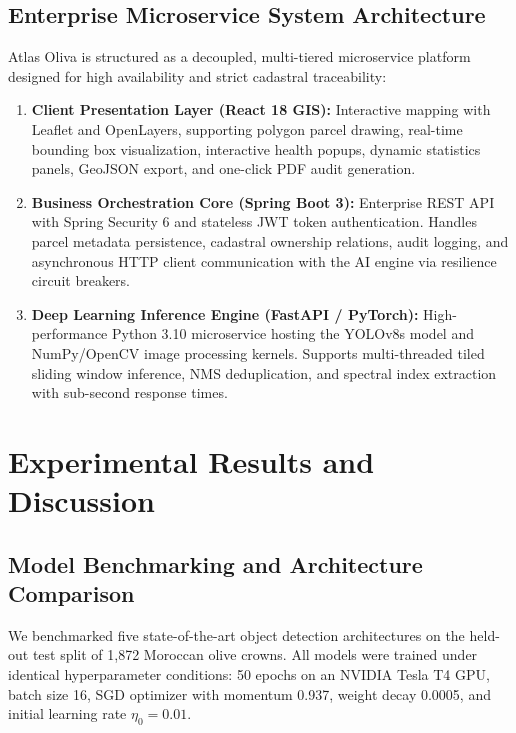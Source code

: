 \documentclass[runningheads]{llncs}
\begin{document}
\subsection{Enterprise Microservice System Architecture}
Atlas Oliva is structured as a decoupled, multi-tiered microservice platform designed for high availability and strict cadastral traceability:
\begin{enumerate}
    \item \textbf{Client Presentation Layer (React 18 GIS):} Interactive mapping with Leaflet and OpenLayers, supporting polygon parcel drawing, real-time bounding box visualization, interactive health popups, dynamic statistics panels, GeoJSON export, and one-click PDF audit generation.
    \item \textbf{Business Orchestration Core (Spring Boot 3):} Enterprise REST API with Spring Security 6 and stateless JWT token authentication. Handles parcel metadata persistence, cadastral ownership relations, audit logging, and asynchronous HTTP client communication with the AI engine via resilience circuit breakers.
    \item \textbf{Deep Learning Inference Engine (FastAPI / PyTorch):} High-performance Python 3.10 microservice hosting the YOLOv8s model and NumPy/OpenCV image processing kernels. Supports multi-threaded tiled sliding window inference, NMS deduplication, and spectral index extraction with sub-second response times.
\end{enumerate}

\section{Experimental Results and Discussion}

\subsection{Model Benchmarking and Architecture Comparison}
We benchmarked five state-of-the-art object detection architectures on the held-out test split of 1,872 Moroccan olive crowns. All models were trained under identical hyperparameter conditions: 50 epochs on an NVIDIA Tesla T4 GPU, batch size 16, SGD optimizer with momentum 0.937, weight decay 0.0005, and initial learning rate $\eta_0 = 0.01$.
\end{document}
